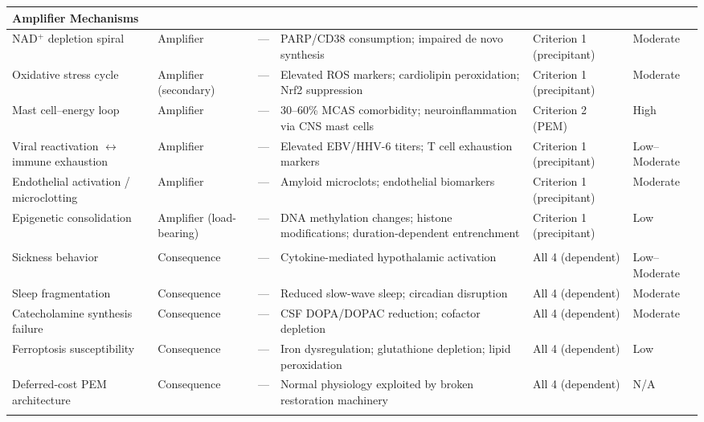 \begin{landscape}
\begin{longtable}{p{3.2cm}p{2.2cm}p{1.2cm}p{4.5cm}p{3.0cm}p{2.5cm}}
\midrule
\multicolumn{6}{l}{\textbf{Amplifier Mechanisms}} \\
\midrule
NAD$^+$ depletion spiral & Amplifier & --- & PARP/CD38 consumption; impaired de novo synthesis & Criterion 1 (precipitant) & Moderate \\
\addlinespace
Oxidative stress cycle & Amplifier (secondary) & --- & Elevated ROS markers; cardiolipin peroxidation; Nrf2 suppression & Criterion 1 (precipitant) & Moderate \\
\addlinespace
Mast cell--energy loop & Amplifier & --- & 30--60\% MCAS comorbidity; neuroinflammation via CNS mast cells & Criterion 2 (PEM) & High \\
\addlinespace
Viral reactivation $\leftrightarrow$ immune exhaustion & Amplifier & --- & Elevated EBV/HHV-6 titers; T cell exhaustion markers & Criterion 1 (precipitant) & Low--Moderate \\
\addlinespace
Endothelial activation / microclotting & Amplifier & --- & Amyloid microclots; endothelial biomarkers & Criterion 1 (precipitant) & Moderate \\
\addlinespace
Epigenetic consolidation & Amplifier (load-bearing) & --- & DNA methylation changes; histone modifications; duration-dependent entrenchment & Criterion 1 (precipitant) & Low \\
\addlinespace

\midrule
\multicolumn{6}{l}{\textbf{Downstream Consequences}} \\
\midrule
Sickness behavior & Consequence & --- & Cytokine-mediated hypothalamic activation & All 4 (dependent) & Low--Moderate \\
\addlinespace
Sleep fragmentation & Consequence & --- & Reduced slow-wave sleep; circadian disruption & All 4 (dependent) & Moderate \\
\addlinespace
Catecholamine synthesis failure & Consequence & --- & CSF DOPA/DOPAC reduction; cofactor depletion & All 4 (dependent) & Moderate \\
\addlinespace
Ferroptosis susceptibility & Consequence & --- & Iron dysregulation; glutathione depletion; lipid peroxidation & All 4 (dependent) & Low \\
\addlinespace
Deferred-cost PEM architecture & Consequence & --- & Normal physiology exploited by broken restoration machinery & All 4 (dependent) & N/A \\
\addlinespace

\end{longtable}
\end{landscape}


